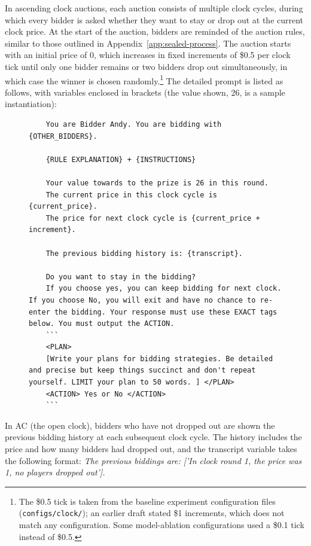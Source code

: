 In ascending clock auctions, each auction consists of multiple clock cycles, during which every bidder is asked whether they want to stay or drop out at the current clock price.
At the start of the auction, bidders are reminded of the auction rules, similar to those outlined in Appendix~\ref{app:sealed-process}.
The auction starts with an initial price of 0, which increases in fixed increments of \$0.5 per clock tick until only one bidder remains or two bidders drop out simultaneously, in which case the winner is chosen randomly.\footnote{The \$0.5 tick is taken from the baseline experiment configuration files (\texttt{configs/clock/}); an earlier draft stated \$1 increments, which does not match any configuration. Some model-ablation configurations used a \$0.1 tick instead of \$0.5. }
The detailed prompt is listed as follows, with variables enclosed in brackets (the value shown, 26, is a sample instantiation):

\begin{figure}[H]
\centering
\begin{minipage}{0.95\textwidth}
\begin{lstlisting}
    You are Bidder Andy. You are bidding with {OTHER_BIDDERS}.

    {RULE EXPLANATION} + {INSTRUCTIONS}

    Your value towards to the prize is 26 in this round.
    The current price in this clock cycle is {current_price}.
    The price for next clock cycle is {current_price + increment}.

    The previous bidding history is: {transcript}.

    Do you want to stay in the bidding?
    If you choose yes, you can keep bidding for next clock. If you choose No, you will exit and have no chance to re-enter the bidding. Your response must use these EXACT tags below. You must output the ACTION.
    ```
    <PLAN>
    [Write your plans for bidding strategies. Be detailed and precise but keep things succinct and don't repeat yourself. LIMIT your plan to 50 words. ] </PLAN>
    <ACTION> Yes or No </ACTION>
    ```
\end{lstlisting}
\end{minipage}
\end{figure}

In AC (the open clock), bidders who have not dropped out are shown the previous bidding history at each subsequent clock cycle. The history includes the price and how many bidders had dropped out,
and the transcript variable takes the following format:
\textit{The previous biddings are:
['In clock round 1, the price was 1,
no players dropped out'].}

